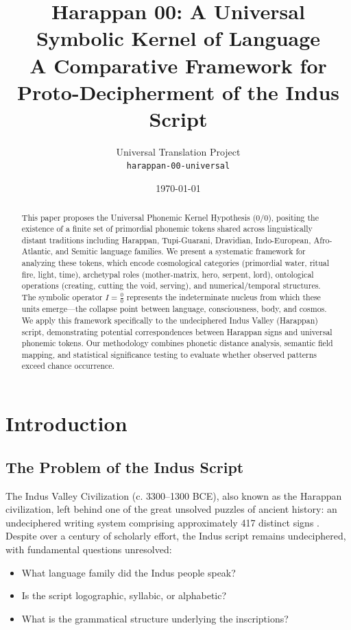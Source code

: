 \documentclass[12pt,a4paper]{article}
\title{Harappan 00: A Universal Symbolic Kernel of Language\\
\large A Comparative Framework for Proto-Decipherment of the Indus Script}
\author{%
    Universal Translation Project\\
    \texttt{harappan-00-universal}
}
\date{\today}
\begin{document}
\maketitle

\begin{abstract}
This paper proposes the Universal Phonemic Kernel Hypothesis (0/0), positing the existence of a finite set of primordial phonemic tokens shared across linguistically distant traditions including Harappan, Tupi-Guarani, Dravidian, Indo-European, Afro-Atlantic, and Semitic language families. We present a systematic framework for analyzing these tokens, which encode cosmological categories (primordial water, ritual fire, light, time), archetypal roles (mother-matrix, hero, serpent, lord), ontological operations (creating, cutting the void, serving), and numerical/temporal structures. The symbolic operator $I = \frac{0}{0}$ represents the indeterminate nucleus from which these units emerge---the collapse point between language, consciousness, body, and cosmos. We apply this framework specifically to the undeciphered Indus Valley (Harappan) script, demonstrating potential correspondences between Harappan signs and universal phonemic tokens. Our methodology combines phonetic distance analysis, semantic field mapping, and statistical significance testing to evaluate whether observed patterns exceed chance occurrence.
\end{abstract}

\section{Introduction}

\subsection{The Problem of the Indus Script}

The Indus Valley Civilization (c. 3300--1300 BCE), also known as the Harappan civilization, left behind one of the great unsolved puzzles of ancient history: an undeciphered writing system comprising approximately 417 distinct signs \citep{parpola1994}. Despite over a century of scholarly effort, the Indus script remains undeciphered, with fundamental questions unresolved:

\begin{itemize}
    \item What language family did the Indus people speak?
    \item Is the script logographic, syllabic, or alphabetic?
    \item What is the grammatical structure underlying the inscriptions?
\end{itemize}
\end{document}
